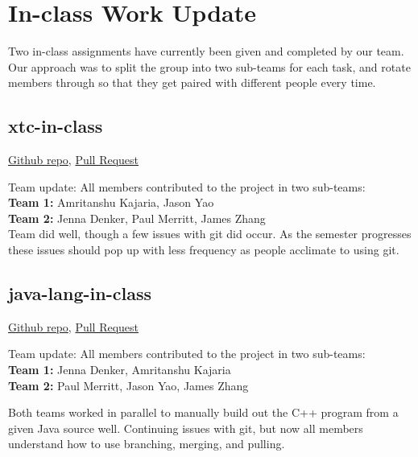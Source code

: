 \documentclass[letterpaper,11pt]{../texMemo} %
\begin{document}
\maketitle %

\section{In-class Work Update}
Two in-class assignments have currently been given and completed by our team. Our approach was to split the group into two sub-teams for each task, and rotate members through so that they get paired with different people every time.

\subsection{xtc-in-class}
\href{https://github.com/JasonYao/xtc-in-class/}{Github repo}, 
\href{https://github.com/nyu-oop-fall16/xtc-in-class/pull/9}{Pull Request}

Team update: All members contributed to the project in two sub-teams:
\\{\bf Team 1:} Amritanshu Kajaria, Jason Yao
\\{\bf Team 2:} Jenna Denker, Paul Merritt, James Zhang
\\Team did well, though a few issues with git did occur. As the semester progresses these issues should pop up with less frequency as people acclimate to using git.

\subsection{java-lang-in-class}
\href{https://github.com/JasonYao/java-lang-in-class}{Github repo}, 
\href{https://github.com/nyu-oop-fall16/java-lang-in-class/pull/6}{Pull Request}

Team update: All members contributed to the project in two sub-teams:
\\{\bf Team 1:} Jenna Denker, Amritanshu Kajaria
\\{\bf Team 2:} Paul Merritt, Jason Yao, James Zhang

Both teams worked in parallel to manually build out the C++ program from a given Java source well. Continuing issues with git, but now all members understand how to use branching, merging, and pulling.
\end{document}
